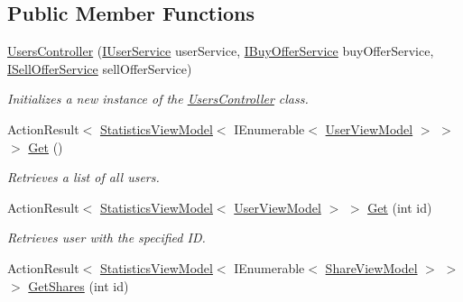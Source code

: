 \subsection*{Public Member Functions}
\begin{DoxyCompactItemize}
\item 
\mbox{\hyperlink{class_gielda_l2_1_1_a_p_i_1_1_controllers_1_1_users_controller_af2f6c27f585aa2ef61809b7e9ec83fe2}{Users\+Controller}} (\mbox{\hyperlink{interface_gielda_l2_1_1_i_n_f_r_a_s_t_r_u_c_t_u_r_e_1_1_interfaces_1_1_i_user_service}{I\+User\+Service}} user\+Service, \mbox{\hyperlink{interface_gielda_l2_1_1_i_n_f_r_a_s_t_r_u_c_t_u_r_e_1_1_interfaces_1_1_i_buy_offer_service}{I\+Buy\+Offer\+Service}} buy\+Offer\+Service, \mbox{\hyperlink{interface_gielda_l2_1_1_i_n_f_r_a_s_t_r_u_c_t_u_r_e_1_1_interfaces_1_1_i_sell_offer_service}{I\+Sell\+Offer\+Service}} sell\+Offer\+Service)
\begin{DoxyCompactList}\small\item\em Initializes a new instance of the \mbox{\hyperlink{class_gielda_l2_1_1_a_p_i_1_1_controllers_1_1_users_controller}{Users\+Controller}} class. \end{DoxyCompactList}\item 
Action\+Result$<$ \mbox{\hyperlink{class_gielda_l2_1_1_a_p_i_1_1_view_models_1_1_view_1_1_statistics_view_model}{Statistics\+View\+Model}}$<$ I\+Enumerable$<$ \mbox{\hyperlink{class_gielda_l2_1_1_a_p_i_1_1_view_models_1_1_view_1_1_user_view_model}{User\+View\+Model}} $>$ $>$ $>$ \mbox{\hyperlink{class_gielda_l2_1_1_a_p_i_1_1_controllers_1_1_users_controller_a763e7ce08170f2681cb87b0a4cd2350a}{Get}} ()
\begin{DoxyCompactList}\small\item\em Retrieves a list of all users. \end{DoxyCompactList}\item 
Action\+Result$<$ \mbox{\hyperlink{class_gielda_l2_1_1_a_p_i_1_1_view_models_1_1_view_1_1_statistics_view_model}{Statistics\+View\+Model}}$<$ \mbox{\hyperlink{class_gielda_l2_1_1_a_p_i_1_1_view_models_1_1_view_1_1_user_view_model}{User\+View\+Model}} $>$ $>$ \mbox{\hyperlink{class_gielda_l2_1_1_a_p_i_1_1_controllers_1_1_users_controller_a0957a53f250fa14681018808613610fe}{Get}} (int id)
\begin{DoxyCompactList}\small\item\em Retrieves user with the specified ID. \end{DoxyCompactList}\item 
Action\+Result$<$ \mbox{\hyperlink{class_gielda_l2_1_1_a_p_i_1_1_view_models_1_1_view_1_1_statistics_view_model}{Statistics\+View\+Model}}$<$ I\+Enumerable$<$ \mbox{\hyperlink{class_gielda_l2_1_1_a_p_i_1_1_view_models_1_1_view_1_1_share_view_model}{Share\+View\+Model}} $>$ $>$ $>$ \mbox{\hyperlink{class_gielda_l2_1_1_a_p_i_1_1_controllers_1_1_users_controller_adbf0440fe0cc3b28ce771a1808e21d8c}{Get\+Shares}} (int id)

\end{DoxyCompactItemize}
